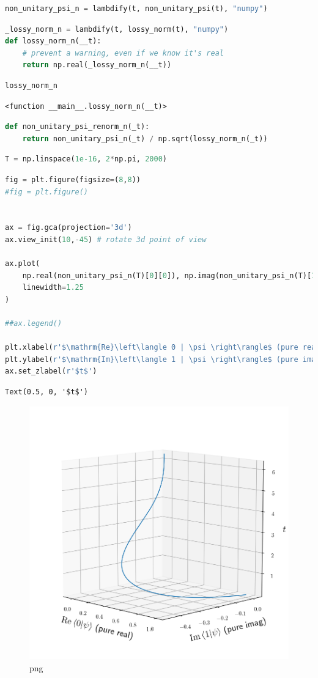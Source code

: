 \begin{lstlisting}[language=Python]
non_unitary_psi_n = lambdify(t, non_unitary_psi(t), "numpy")
\end{lstlisting}

\begin{lstlisting}[language=Python]
_lossy_norm_n = lambdify(t, lossy_norm(t), "numpy")
def lossy_norm_n(__t):
    # prevent a warning, even if we know it's real
    return np.real(_lossy_norm_n(__t))
\end{lstlisting}

\begin{lstlisting}[language=Python]
lossy_norm_n
\end{lstlisting}

\begin{lstlisting}
<function __main__.lossy_norm_n(__t)>
\end{lstlisting}

\begin{lstlisting}[language=Python]
def non_unitary_psi_renorm_n(_t):
    return non_unitary_psi_n(_t) / np.sqrt(lossy_norm_n(_t))
\end{lstlisting}

\begin{lstlisting}[language=Python]
T = np.linspace(1e-16, 2*np.pi, 2000)
\end{lstlisting}

\begin{lstlisting}[language=Python]
fig = plt.figure(figsize=(8,8))
#fig = plt.figure()


ax = fig.gca(projection='3d')
ax.view_init(10,-45) # rotate 3d point of view

ax.plot(
    np.real(non_unitary_psi_n(T)[0][0]), np.imag(non_unitary_psi_n(T)[1][0]), T,
    linewidth=1.25
)

##ax.legend()

plt.xlabel(r'$\mathrm{Re}\left\langle 0 | \psi \right\rangle$ (pure real)', labelpad=8)
plt.ylabel(r'$\mathrm{Im}\left\langle 1 | \psi \right\rangle$ (pure imag)', labelpad=10)
ax.set_zlabel(r'$t$')
\end{lstlisting}

\begin{lstlisting}
Text(0.5, 0, '$t$')
\end{lstlisting}

\begin{figure}
\centering
\includegraphics[width=0.6\linewidth]{output_30_1.png}
\caption[]{png}
\end{figure}

